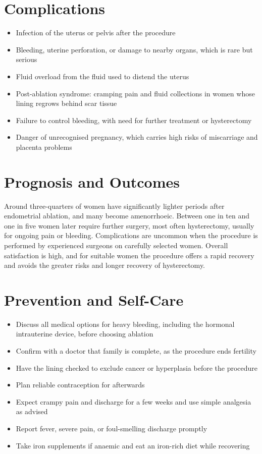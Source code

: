 \section*{Complications}
\begin{itemize}
    \item Infection of the uterus or pelvis after the procedure
    \item Bleeding, uterine perforation, or damage to nearby organs, which is rare but serious
    \item Fluid overload from the fluid used to distend the uterus
    \item Post-ablation syndrome: cramping pain and fluid collections in women whose lining regrows behind scar tissue
    \item Failure to control bleeding, with need for further treatment or hysterectomy
    \item Danger of unrecognised pregnancy, which carries high risks of miscarriage and placenta problems
\end{itemize}

\section*{Prognosis and Outcomes}
Around three-quarters of women have significantly lighter periods after endometrial ablation, and many become amenorrhoeic. Between one in ten and one in five women later require further surgery, most often hysterectomy, usually for ongoing pain or bleeding. Complications are uncommon when the procedure is performed by experienced surgeons on carefully selected women. Overall satisfaction is high, and for suitable women the procedure offers a rapid recovery and avoids the greater risks and longer recovery of hysterectomy.

\section*{Prevention and Self-Care}
\begin{itemize}
    \item Discuss all medical options for heavy bleeding, including the hormonal intrauterine device, before choosing ablation
    \item Confirm with a doctor that family is complete, as the procedure ends fertility
    \item Have the lining checked to exclude cancer or hyperplasia before the procedure
    \item Plan reliable contraception for afterwards
    \item Expect crampy pain and discharge for a few weeks and use simple analgesia as advised
    \item Report fever, severe pain, or foul-smelling discharge promptly
    \item Take iron supplements if anaemic and eat an iron-rich diet while recovering
\end{itemize}

